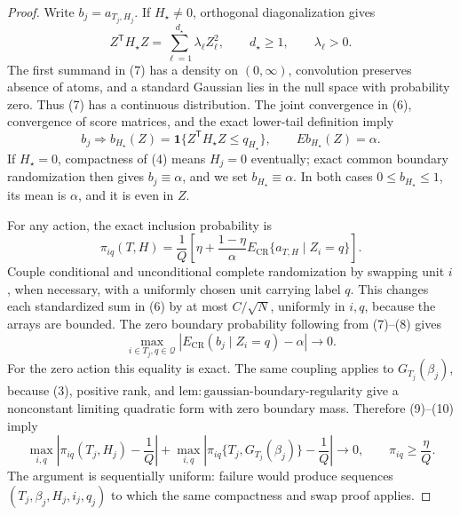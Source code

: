 \documentclass{article}
\begin{document}
\begin{proof}
Write \(b_j=a_{T_j,H_j}\).  If \(H_\star\neq0\), orthogonal diagonalization gives
\[
Z^{\mathsf T}H_\star Z
=\sum_{\ell=1}^{d_\star}\lambda_\ell Z_\ell^2,
\qquad d_\star\geq1,
\qquad \lambda_\ell>0.
\tag{7}
\]
The first summand in (7) has a density on \((0,\infty)\), convolution preserves absence of atoms, and a standard Gaussian lies in the null space with probability zero.  Thus (7) has a continuous distribution.  The joint convergence in (6), convergence of score matrices, and the exact lower-tail definition imply
\[
b_j\Rightarrow b_{H_\star}(Z)
=\mathbf 1\{Z^{\mathsf T}H_\star Z\leq q_{H_\star}\},
\qquad E b_{H_\star}(Z)=\alpha.
\tag{8}
\]
If \(H_\star=0\), compactness of (4) means \(H_j=0\) eventually; exact common boundary randomization then gives \(b_j\equiv\alpha\), and we set \(b_{H_\star}\equiv\alpha\).  In both cases \(0\leq b_{H_\star}\leq1\), its mean is \(\alpha\), and it is even in \(Z\).

For any action, the exact inclusion probability is
\[
\pi_{iq}(T,H)
=\frac1Q\left[
\eta+\frac{1-\eta}{\alpha}
E_{\mathrm{CR}}\{a_{T,H}\mid Z_i=q\}
\right].
\tag{9}
\]
Couple conditional and unconditional complete randomization by swapping unit \(i\), when necessary, with a uniformly chosen unit carrying label \(q\).  This changes each standardized sum in (6) by at most \(C/\sqrt N\), uniformly in \(i,q\), because the arrays are bounded.  The zero boundary probability following from (7)--(8) gives
\[
\max_{i\in T_j,q\in\mathcal Q}
\left|E_{\mathrm{CR}}(b_j\mid Z_i=q)-\alpha\right|
\longrightarrow0.
\tag{10}
\]
For the zero action this equality is exact.  The same coupling applies to \(G_{T_j}(\beta_j)\), because (3), positive rank, and \(\mathrm{lem{:}gaussian\text{-}boundary\text{-}regularity}\) give a nonconstant limiting quadratic form with zero boundary mass.  Therefore (9)--(10) imply
\[
\max_{i,q}\left|
\pi_{iq}(T_j,H_j)-\frac1Q\right|
+\max_{i,q}\left|
\pi_{iq}\{T_j,G_{T_j}(\beta_j)\}-\frac1Q\right|
\longrightarrow0,
\qquad
\pi_{iq}\geq\frac\eta Q.
\tag{11}
\]
The argument is sequentially uniform: failure would produce sequences \((T_j,\beta_j,H_j,i_j,q_j)\) to which the same compactness and swap proof applies.


\end{proof}
\end{document}
